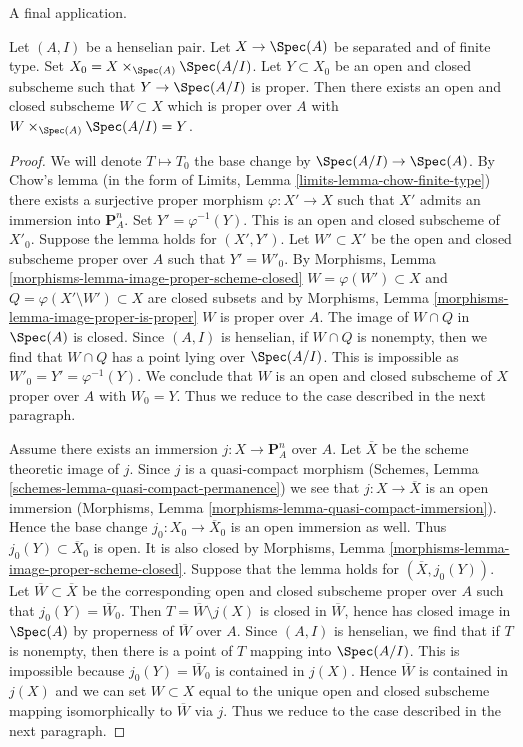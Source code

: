 \noindent
A final application.

\begin{lemma}
\label{lemma-split-off-proper-part-henselian}
Let $(A, I)$ be a henselian pair. Let $X \to \Spec(A)$
be separated and of finite type. Set $X_0 = X \times_{\Spec(A)} \Spec(A/I)$.
Let $Y \subset X_0$ be an open and closed subscheme such that
$Y \to \Spec(A/I)$ is proper. Then there exists an open and closed
subscheme $W \subset X$ which is proper over $A$ with
$W \times_{\Spec(A)} \Spec(A/I) = Y$.
\end{lemma}

\begin{proof}
We will denote $T \mapsto T_0$ the base change by $\Spec(A/I) \to \Spec(A)$.
By Chow's lemma (in the form of
Limits, Lemma \ref{limits-lemma-chow-finite-type})
there exists a surjective proper morphism $\varphi : X' \to X$ such
that $X'$ admits an immersion into $\mathbf{P}^n_A$.
Set $Y' = \varphi^{-1}(Y)$. This is an open and closed subscheme
of $X'_0$. Suppose the lemma holds for $(X', Y')$. Let $W' \subset X'$
be the open and closed subscheme proper over $A$ such that $Y' = W'_0$.
By Morphisms, Lemma \ref{morphisms-lemma-image-proper-scheme-closed}
$W = \varphi(W') \subset X$ and
$Q = \varphi(X' \setminus W') \subset X$ are closed subsets and by
Morphisms, Lemma \ref{morphisms-lemma-image-proper-is-proper}
$W$ is proper over $A$. The image of $W \cap Q$ in $\Spec(A)$ is closed.
Since $(A, I)$ is henselian, if $W \cap Q$ is nonempty, then we
find that $W \cap Q$ has a point lying over $\Spec(A/I)$.
This is impossible as $W'_0 = Y' = \varphi^{-1}(Y)$.
We conclude that $W$ is an open and closed subscheme
of $X$ proper over $A$ with $W_0 = Y$.
Thus we reduce to the case described in the next paragraph.

\medskip\noindent
Assume there exists an immersion $j : X \to \mathbf{P}^n_A$ over $A$.
Let $\overline{X}$ be the scheme theoretic image of $j$.
Since $j$ is a quasi-compact morphism
(Schemes, Lemma \ref{schemes-lemma-quasi-compact-permanence})
we see that $j : X \to \overline{X}$ is an open immersion
(Morphisms, Lemma \ref{morphisms-lemma-quasi-compact-immersion}).
Hence the base change $j_0 : X_0 \to \overline{X}_0$
is an open immersion as well.
Thus $j_0(Y) \subset \overline{X}_0$ is open.
It is also closed by Morphisms, Lemma
\ref{morphisms-lemma-image-proper-scheme-closed}.
Suppose that the lemma holds for $(\overline{X}, j_0(Y))$.
Let $\overline{W} \subset \overline{X}$ be the
corresponding open and closed subscheme proper over $A$
such that $j_0(Y) = \overline{W}_0$.
Then $T = \overline{W} \setminus j(X)$ is closed in $\overline{W}$,
hence has closed image in $\Spec(A)$ by properness of $\overline{W}$
over $A$. Since $(A, I)$ is henselian, we find that if $T$
is nonempty, then there is a point of $T$ mapping into $\Spec(A/I)$.
This is impossible because $j_0(Y) = \overline{W}_0$ is contained in $j(X)$.
Hence $\overline{W}$ is contained in $j(X)$ and we can
set $W \subset X$ equal to the unique open and closed
subscheme mapping isomorphically to $\overline{W}$ via $j$.
Thus we reduce to the case described in the next paragraph.


\end{proof}
